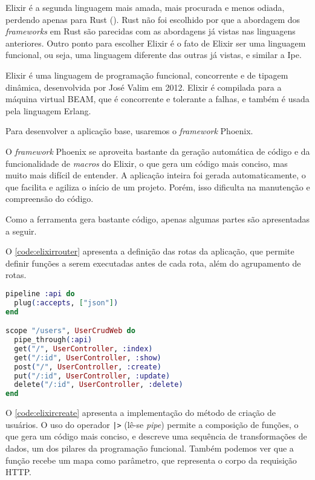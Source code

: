 Elixir é a segunda linguagem mais amada, mais procurada e menos odiada, perdendo
apenas para Rust (\textcite{stackoverflowsurvey}). Rust não foi escolhido por que
a abordagem dos \textit{frameworks} em Rust são parecidas com as abordagens já
vistas nas linguagens anteriores. Outro ponto para escolher Elixir é o fato de
Elixir ser uma linguagem funcional, ou seja, uma linguagem diferente das outras
já vistas, e similar a Ipe.

Elixir é uma linguagem de programação funcional, concorrente e de tipagem dinâmica,
desenvolvida por José Valim em 2012. Elixir é compilada para a máquina virtual
BEAM, que é concorrente e tolerante a falhas, e também é usada pela linguagem
Erlang.

Para desenvolver a aplicação base, usaremos o \textit{framework} Phoenix.

O \textit{framework} Phoenix se aproveita bastante da geração automática de código
e da funcionalidade de \textit{macros} do Elixir, o que gera um código mais conciso,
mas muito mais difícil de entender. A aplicação inteira foi gerada automaticamente,
o que facilita e agiliza o início de um projeto. Porém, isso dificulta na manutenção
e compreensão do código.

Como a ferramenta gera bastante código, apenas algumas partes são apresentadas a
seguir.

O \autoref{code:elixirrouter} apresenta a definição das rotas da aplicação, que
permite definir funções a serem executadas antes de cada rota, além do agrupamento
de rotas.


\begin{lstlisting}[language=Elixir,label={code:elixirrouter},caption={Definição das rotas da aplicação em Elixir com Phoenix}]
pipeline :api do
  plug(:accepts, ["json"])
end

scope "/users", UserCrudWeb do
  pipe_through(:api)
  get("/", UserController, :index)
  get("/:id", UserController, :show)
  post("/", UserController, :create)
  put("/:id", UserController, :update)
  delete("/:id", UserController, :delete)
end
\end{lstlisting}

O \autoref{code:elixircreate} apresenta a implementação do método de criação de
usuários. O uso do operador \texttt{|>} (lê-se \textit{pipe}) permite a composição
de funções, o que gera um código mais conciso, e descreve uma sequência de
transformações de dados, um dos pilares da programação funcional. Também podemos
ver que a função recebe um mapa como parâmetro, que representa o corpo da requisição
HTTP.

